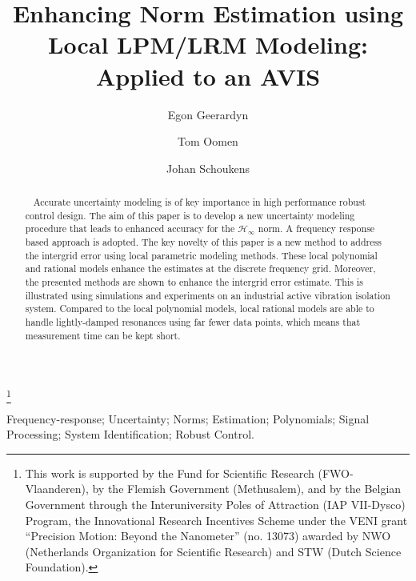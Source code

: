 \begin{frontmatter}

\title{Enhancing \Hinf{} Norm Estimation using Local LPM/LRM  Modeling: Applied to an AVIS}

\thanks[thx]{This work is supported by the Fund for Scientific Research (FWO-Vlaanderen), by the Flemish Government (Methusalem), and by the Belgian Government through the Interuniversity Poles of Attraction (IAP VII-Dysco) Program, the Innovational Research Incentives Scheme under the VENI grant ``Precision Motion: Beyond the Nanometer'' (no. 13073) awarded by NWO (Netherlands Organization for Scientific Research) and STW (Dutch Science Foundation).}

\author[VUB]{Egon Geerardyn} 
\author[TUE]{Tom Oomen} 
\author[VUB]{Johan Schoukens}

\address[VUB]{ELEC Department, Vrije Universiteit Brussel, Brussels, Belgium. \\ (e-mails: \href{mailto:egon.geerardyn@vub.ac.be}{egon.geerardyn}, \href{mailto:johan.schoukens@vub.ac.be}{johan.schoukens} @vub.ac.be)}
\address[TUE]{Control System Technology Group, Mechanical Engineering Department, Technische Universiteit Eindhoven, Eindhoven, the Netherlands. (e-mail: \href{mailto:t.a.e.oomen@tue.nl}{t.a.e.oomen@tue.nl})}

\begin{keyword}
Frequency-response;
Uncertainty;
Norms;
Estimation;
Polynomials;
Signal Processing;
System Identification;
Robust Control.
\end{keyword}

\begin{abstract}~
Accurate uncertainty modeling is of key importance in high performance robust control design. 
The aim of this paper is to develop a new uncertainty modeling procedure that leads to enhanced accuracy for the $\mathcal{H}_\infty$ norm. 
A frequency response based approach is adopted. 
The key novelty of this paper is a new method to address the intergrid error using local parametric modeling methods. 
These local polynomial and rational models enhance the estimates at the discrete frequency grid.
Moreover, the presented methods are shown to enhance the intergrid error estimate.
This is illustrated using simulations and experiments on an industrial active vibration isolation system.
Compared to the local polynomial models, local rational models are able to handle lightly-damped resonances using far fewer data points, which means that measurement time can be kept short.
\end{abstract}

\end{frontmatter}

